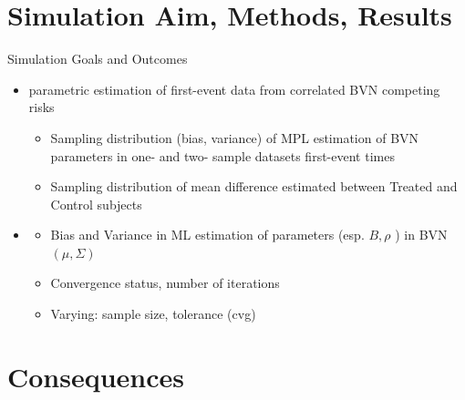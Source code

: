 \documentclass[10pt]{beamer}
\providecommand{\tightlist}{%
\setlength{\itemsep}{0pt}\setlength{\parskip}{0pt}}
\begin{document}
\section{Simulation Aim, Methods, Results}

\begin{frame}{Simulation Goals and Outcomes}
\begin{itemize}
\item
  {\color{DarkBlue}{Aim:}} parametric estimation of \alert{first-event data} from correlated
  BVN competing risks

  \begin{itemize}
  \tightlist
  \item
    Sampling distribution (\alert{bias, variance}) of MPL estimation of
    BVN parameters in one- and two- sample datasets  first-event times
  \item
    Sampling distribution of mean difference estimated between Treated
    and Control subjects
  \end{itemize}

\item {\color{DarkBlue}{Simulation outcomes}}
  \begin{itemize}
  \tightlist
  \item Bias and Variance in ML estimation of parameters (esp. \( B,  \rho \) ) in BVN\( (\mu,\Sigma) \)
  \item Convergence status, number of iterations
  \item Varying: sample size, tolerance (cvg)
  \end{itemize}
\end{itemize}
\end{frame}







\section{Consequences}
\end{document}
